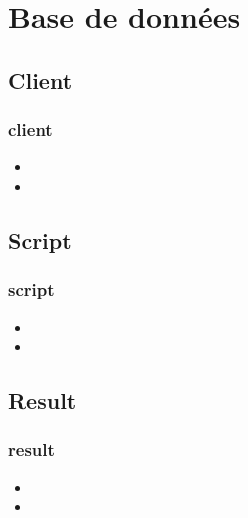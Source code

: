 \section{Base de données}

\subsection{Client}
		\begin{frame}
		    \frametitle{\textbf{client}}
			\begin{itemize}
				 \item 
				 \item 
			\end{itemize}
		\end{frame}

\subsection{Script}
	\begin{frame}
		\frametitle{\textbf{script}}
		\begin{itemize}
			\item 
			\item 
		\end{itemize}
	\end{frame}

\subsection{Result}
	\begin{frame}
		\frametitle{\textbf{result}}
		\begin{itemize}
			\item
			\item
		\end{itemize}
	\end{frame}

